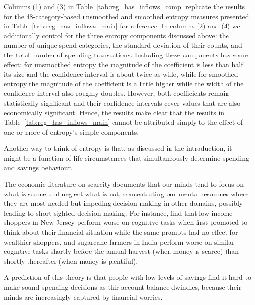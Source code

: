 

Columns (1) and (3) in Table~\ref{tab:reg_has_inflows_comp} replicate the
results for the 48-category-based unsmoothed and smoothed entropy measures
presented in Table~\ref{tab:reg_has_inflows_main} for reference. In columns (2)
and (4) we additionally control for the three entropy components discussed
above: the number of unique spend categories, the standard deviation of their
counts, and the total number of spending transactions. Including these
components has some effect: for unsmoothed entropy the magnitude of the
coefficient is less than half its size and the confidence interval is about
twice as wide, while for smoothed entropy the magnitude of the coefficient is a
little higher while the width of the confidence interval also roughly doubles.
However, both coefficients remain statistically significant and their
confidence intervals cover values that are also economically significant.
Hence, the results make clear that the results in
Table~\ref{tab:reg_has_inflows_main} cannot be attributed simply to the effect
of one or more of entropy's simple components.

Another way to think of entropy is that, as discussed in the introduction, it
might be a function of life circumstances that simultaneously determine
spending and savings behaviour.


The economic literature on scarcity documents that our minds tend to focus on
what is scarce and neglect what is not, concentrating our mental resources
where they are most needed but impeding decision-making in other domains,
possibly leading to short-sighted decision making\citep{shah2012some,
mullainathan2013scarcity, haushofer2014psychology}. For instance,
\citet{mani2013poverty} find that low-income shoppers in New Jersey perform
worse on cognitive tasks when first promoted to think about their financial
situation while the same prompts had no effect for wealthier shoppers, and
sugarcane farmers in India perform worse on similar cognitive tasks shortly
before the annual harvest (when money is scarce) than shortly thereafter (when
money is plentiful). 

A prediction of this theory is that people with low levels of savings find it
hard to make sound spending decisions as thir account balance dwindles, because
their minds are increasingly captured by financial worries.


